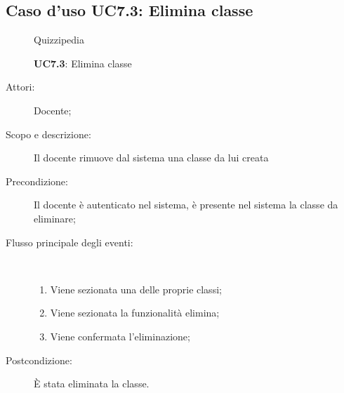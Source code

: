 \subsection{Caso d'uso UC7.3: Elimina classe}
	\begin{figure}[H]
		\centering
		\begin{resizedtikzpicture}{\textwidth}
		\begin{umlsystem}[x=0, fill=lightgray!20]{Quizzipedia}
		\end{umlsystem}
		\end{resizedtikzpicture}
		\caption{\textbf{UC7.3}: Elimina classe}
		\label{UC7.3}
	\end{figure}
\begin{description}
\item[Attori:] Docente;
\item[Scopo e descrizione:] Il docente rimuove dal sistema una classe da lui creata 
      \item[Precondizione:] Il docente è autenticato nel sistema, è presente nel sistema la classe da eliminare;

        \item[Flusso principale degli eventi:] \ 
 \begin{enumerate}
          \item Viene sezionata una delle proprie classi;
          \item Viene sezionata la funzionalità elimina;
          \item Viene confermata l'eliminazione;

      \end{enumerate}
    \item[Postcondizione:] È stata eliminata la classe.
  \end{description}
\hypertarget{UC7.4}{}
